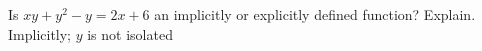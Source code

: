 {Is $xy+y^2 -y = 2x+6$ an implicitly or explicitly defined function? Explain.}
{Implicitly; $y$ is not isolated}
